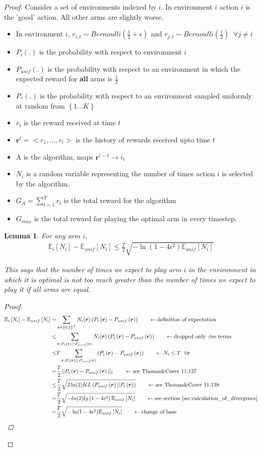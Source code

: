 \documentclass{article}
\newcommand{\E}{\mathbb E}
\newcommand{\set}[1]{\left\{#1\right\}}
\newcommand{\eqn}[1]{\begin{align}#1\end{align}}
\renewcommand{\Pi}[1]{P_i\left( #1 \right)}
\newcommand{\Pu}[1]{P_{unif}\left( #1 \right)}
\newcommand{\Ps}[1]{P_{*}\left( #1 \right)}
\newcommand{\Ei}[1]{\E_i\left[ #1 \right]}
\newcommand{\Eu}[1]{\E_{unif}\left[ #1 \right]}
\renewcommand{\r}{\boldsymbol{r}}
\renewcommand{\log}[1]{lg\left( #1 \right)}
\newcommand{\kl}[2]{KL\left(#1 || #2 \right)}
\theoremstyle{plain}
\newtheorem{lemma}[theorem]{Lemma}
\theoremstyle{definition}
\begin{document}
\begin{proof}

Consider a set of environments indexed by $i$. In environment $i$ action $i$ is the 'good' action. All other arms are slightly worse. 
\begin{itemize}
\item  In environment $i$, $r_{i,t} \sim Bernoulli(\frac{1}{2}+\epsilon)$ and $r_{j,t} \sim Bernoulli(\frac{1}{2}) \;\; \forall j \neq i$ 
\item $\Pi{.}$ is the probability with respect to environment $i$
\item $\Pu{.}$ is the probability with respect to an environment in which the expected reward for \textbf{all} arms is $\frac{1}{2}$
\item $\Ps{.}$ is the probability with respect to an environment sampled uniformly at random from $\set{1...K}$
\item $r_t$ is the reward received at time $t$
\item $\boldsymbol{r}^t = <r_1,...,r_t>$ is the history of rewards received upto time $t$
\item A is the algorithm, maps $\boldsymbol{r}^{t-1} \rightarrow i_t$
\item $N_i$ is a random variable representing the number of times action $i$ is selected by the algorithm.
\item $G_A = \sum_{t=1}^T r_t$ is the total reward for the algorithm
\item $G_{max}$ is the total reward for playing the optimal arm in every timestep. 

\end{itemize}

\begin{lemma}
\label{lem:N_not_too_big}
For any arm $i$,
\eqn{
\Ei{N_i} -\Eu{N_i} \leq  \frac{T}{2}\sqrt{-\ln({1-4\epsilon^2})\Eu{N_i}}
}

This says that the number of times we expect to play arm $i$ in the environment in which it is optimal is not too much greater than the number of times we expect to play it if all arms are equal. 

\begin{proof}
\eqn{
\Ei{N_i} -\Eu{N_i} = & \sum_{\r \in \set{0,1}^T}N_i(\r)\left(\Pi{\r} - \Pu{\r} \right) \qquad \leftarrow \text{definition of expectation}\\
\leq & \sum_{\r:\Pi{\r} \geq \Pu{\r}}N_i(\r)\left(\Pi{\r} - \Pu{\r} \right) \qquad \leftarrow \text{dropped only -ive terms}\\
\leq & T\sum_{\r:\Pi{\r} \geq \Pu{\r}}\left(\Pi{\r} - \Pu{\r} \right) \qquad \leftarrow N_i \leq T \;\; \forall \r\\
 = & \frac{T}{2}|| \Pi{\r} - \Pu{\r}||_1 \qquad \leftarrow \text{see Thomas\&Cover 11.137}\\
 \leq & \frac{T}{2}\sqrt{2\ln({2})\kl{\Pu{\r}}{\Pi{\r}}} \qquad \leftarrow \text{see Thomas\&Cover 11.138}\\
  = & \frac{T}{2}\sqrt{-ln(2)\log{1-4\epsilon^2} \Eu{N_i}} \qquad \leftarrow \text{see section \ref{sec:calculation_of_divergence}}\\
    = & \frac{T}{2}\sqrt{-\ln({1-4\epsilon^2}) \Eu{N_i}} \qquad \leftarrow \text{change of base}
}


\end{proof}
\end{lemma}
\end{proof}
\end{document}
